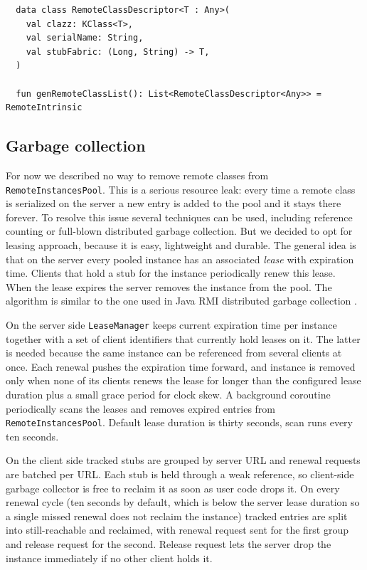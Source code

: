 \documentclass[a4paper,11pt,oneside]{article}
\newcommand{\term}[1]{\textit{#1}}
\newcommand{\kotlini}[1]{\texttt{#1}}
\newcommand{\ki}[1]{\kotlini{#1}}
\begin{document}
\begin{listing}[!h]
  \begin{verbatim}
  data class RemoteClassDescriptor<T : Any>(
    val clazz: KClass<T>,
    val serialName: String,
    val stubFabric: (Long, String) -> T,
  )

  fun genRemoteClassList(): List<RemoteClassDescriptor<Any>> = RemoteIntrinsic
  \end{verbatim}
  \caption{genRemoteClassList intrinsic}\label{gen_remote_class_list}
\end{listing}

\subsection{Garbage collection}\label{garbade_collection_section}

For now we described no way to remove remote classes from \ki{RemoteInstancesPool}. This is a serious
resource leak: every time a remote class is serialized on the server a new entry is added to the
pool and it stays there forever. To resolve this issue several techniques can be used, including
reference counting or full-blown distributed garbage collection. But we decided to opt for leasing
approach, because it is easy, lightweight and durable. The general idea is that on the server
every pooled instance has an associated \term{lease} with expiration time. Clients that hold a
stub for the instance periodically renew this lease. When the lease expires the server removes
the instance from the pool. The algorithm is similar to the one used in Java RMI distributed
garbage collection \cite{noauthor_java_nodate}.

On the server side \ki{LeaseManager} keeps current expiration time per instance together with a
set of client identifiers that currently hold leases on it. The latter is needed because the same
instance can be referenced from several clients at once. Each renewal pushes the expiration time
forward, and instance is removed only when none of its clients renews the lease for longer than
the configured lease duration plus a small grace period for clock skew. A background coroutine
periodically scans the leases and removes expired entries from \ki{RemoteInstancesPool}. Default
lease duration is thirty seconds, scan runs every ten seconds.

On the client side tracked stubs are grouped by server URL and renewal requests are batched per
URL. Each stub is held through a weak reference, so client-side garbage collector is free to
reclaim it as soon as user code drops it. On every renewal cycle (ten seconds by default, which is
below the server lease duration so a single missed renewal does not reclaim the instance) tracked
entries are split into still-reachable and reclaimed, with renewal request sent for the first
group and release request for the second. Release request lets the server drop the instance
immediately if no other client holds it.
\end{document}
